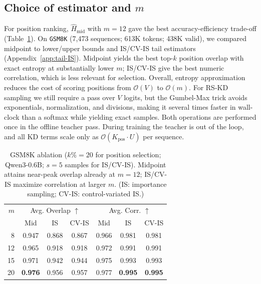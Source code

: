 \documentclass[11pt]{article}
\begin{document}
\subsection{Choice of estimator and $m$}
For position ranking, $\widehat{H}_{\text{mid}}$ with $m{=}12$ gave the best accuracy-efficiency trade-off (Table~\ref{tab:entropy-ablation}).
On \texttt{GSM8K} (7{,}473 sequences; 613K tokens; 438K valid), we compared midpoint to lower/upper bounds and IS/CV-IS tail estimators (Appendix~\ref{app:tail-IS}).
Midpoint yields the best top-$k$ position overlap with exact entropy at substantially lower $m$; IS/CV-IS give the best numeric correlation, which is less relevant for selection.
Overall, entropy approximation reduces the cost of scoring positions from $\mathcal{O}(V)$ to $\mathcal{O}(m)$.
For RS-KD sampling we still require a pass over $V$ logits, but the Gumbel-Max trick avoids exponentials, normalization, and divisions, making it several times faster in wall-clock than a softmax while yielding exact samples.
Both operations are performed once in the offline teacher pass.
During training the teacher is out of the loop, and all KD terms scale only as $\mathcal{O}(K_{\text{pos}}\!\cdot\!U)$ per sequence.

\vspace{-0.5em}
\begin{table}[h]
	\centering
	\small
	\setlength{\tabcolsep}{6pt}
	\begin{tabular}{rcccccc}
		\toprule
		$m$ & \multicolumn{3}{c}{Avg. Overlap $\uparrow$} & \multicolumn{3}{c}{Avg. Corr. $\uparrow$                                                   } \\
		\cmidrule(lr){2-4}\cmidrule(lr){5-7}
		    & Mid                                         & IS                                        & CV-IS & Mid   & IS             & CV-IS          \\
		\midrule
		8   & 0.947                                       & 0.868                                     & 0.867 & 0.966 & 0.981          & 0.981          \\
		12  & 0.965                                       & 0.918                                     & 0.918 & 0.972 & 0.991          & 0.991          \\
		15  & 0.971                                       & 0.942                                     & 0.944 & 0.975 & 0.993          & 0.993          \\
		20  & \textbf{0.976}                              & 0.956                                     & 0.957 & 0.977 & \textbf{0.995} & \textbf{0.995} \\
		\bottomrule
	\end{tabular}
	\caption{GSM8K ablation ($k\%{=}20$ for position selection; Qwen3-0.6B; $s{=}5$ samples for IS/CV-IS). Midpoint attains near-peak overlap already at $m{=}12$; IS/CV-IS maximize correlation at larger $m$. (IS: importance sampling; CV-IS: control-variated IS.)}
	\label{tab:entropy-ablation}
\end{table}
\vspace{-0.75em}
\end{document}

